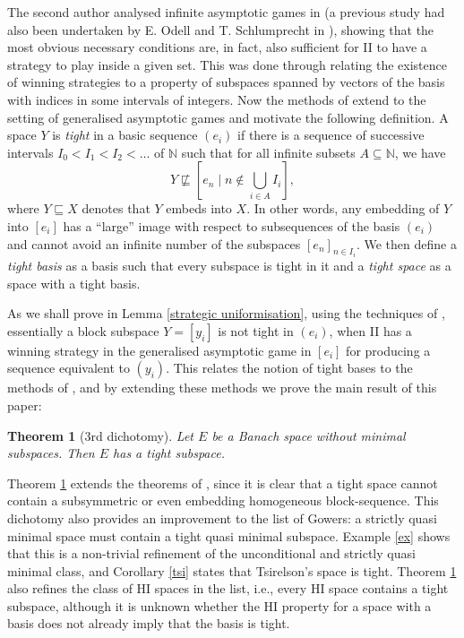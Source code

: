 \documentclass[10pt]{amsart}
\numberwithin{equation}{section}
\newtheorem{thm}{Theorem}[section]
\begin{document}
The second author analysed infinite asymptotic games in \cite{asymptotic} (a
previous study had also been undertaken by E. Odell and T. Schlumprecht in
\cite{os:trees}), showing that the most obvious necessary conditions are, in
fact, also sufficient for II to have a strategy to play inside a given set.
This was done through relating the existence of winning strategies to a
property of subspaces spanned by vectors of the basis with indices in some
intervals of integers. Now the methods of \cite{asymptotic} extend to the
setting of generalised asymptotic games and motivate the following definition.
A space $Y$ is {\em tight} in a basic sequence $(e_i)$ if there is a sequence
of successive intervals $I_0<I_1<I_2<\ldots$ of ${\mathbb N}$ such that for all infinite
subsets $A\subseteq {\mathbb N}$, we have
$$
Y\not\sqsubseteq [e_n{ \; \big| \;} n\notin \bigcup_{i\in A}I_i],
$$
where $Y\sqsubseteq X$ denotes that $Y$ embeds into $X$. In other words, any
embedding of $Y$ into $[e_i]$ has a ``large'' image with respect to
subsequences of the basis $(e_i)$ and cannot avoid an infinite number of the
subspaces  $[e_n]_{n\in I_i}$. We then define a {\em tight basis} as a basis
such that every subspace is tight in it and a {\em tight space} as a space with
a tight basis.

As we shall prove in Lemma \ref{strategic uniformisation}, using the techniques
of \cite{asymptotic}, essentially a block subspace $Y=[y_i]$ is not tight in
$(e_i)$, when II has a winning strategy in the generalised asymptotic game in
$[e_i]$ for producing a sequence equivalent to $(y_i)$. This relates the notion
of tight bases to the methods  of \cite{subsurfaces}, and by extending these
methods we prove the main result of this paper:

\begin{thm}[3rd dichotomy]\label{main}
Let $E$ be a Banach space without minimal subspaces. Then $E$ has a tight subspace.
\end{thm}

Theorem \ref{main} extends the theorems of \cite{anna,subsurfaces}, since it is
clear that a tight space cannot contain a subsymmetric or even embedding
homogeneous block-sequence. This dichotomy also provides an improvement to the
list of Gowers: a strictly quasi minimal space must contain a tight quasi
minimal subspace. Example \ref{ex} shows that this is a non-trivial refinement
of the unconditional and strictly quasi minimal class, and Corollary \ref{tsi}
states that Tsirelson's space is tight. Theorem \ref{main} also refines the
class of HI spaces in the list, i.e., every HI space contains a tight subspace,
although it is unknown whether the HI property for a space with a basis does
not already imply that the basis is tight.
\end{document}
